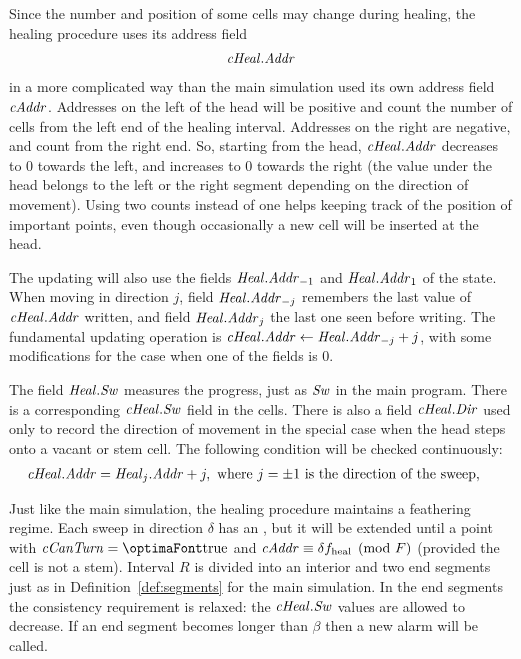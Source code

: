 \documentclass[12pt]{memoir}
\newcommand{\authnote}[3]
{\text{{ \textcolor{#3}{\( \langle\hspace{-0.2em}\langle \)\textsf{\footnotesize #1: #2}\( \rangle\hspace{-0.2em}\rangle \)}}}}
\newcommand{\authnote}[2]{}
\newcommand{\Pnote}[1]{{\authnote{P}{#1}{cyan}}}
\newcommand{\fld}[1]{\ensuremath{\textit{#1\/}}}
\newcommand{\tHeal}{f_{\mathrm{heal}}}
\newcommand{\R}{R}
\newcommand{\F}{F}
\newcommand{\Addr}{\fld{Addr}}
\newcommand{\cAddr}{\fld{cAddr}}
\newcommand{\cCanTurn}{\fld{cCanTurn}}
\newcommand{\Dir}{\fld{Dir}}
\newcommand{\Heal}{\fld{Heal}}
\newcommand{\cHeal}{\fld{cHeal}}
\newcommand{\Sweep}{\fld{Sw}}
\begin{document}
Since the number and position of some cells may change during healing, 
the healing procedure uses its address field
 \begin{align*}
 \cHeal.\Addr 
 \end{align*}
in a more complicated way than the main simulation used its own address field \( \cAddr \).
Addresses on the left of the head will be positive and count
the number of cells from the left end of the healing interval.
Addresses on the right are negative, and count from the right end.
So, starting from the head, \( \cHeal.\Addr \) decreases to 0 towards the left, 
and increases to 0 towards the right (the value under the head belongs to
the left or the right segment depending on the direction of movement).
Using two counts instead of one helps keeping track of the position of important points,
even though occasionally a new cell will be inserted at the head.

The updating will also use the fields
\( \Heal.\Addr_{-1} \) and \( \Heal.\Addr_{1} \) of the state.
When moving in direction \( j \), field \( \Heal.\Addr_{-j} \) remembers the last
value of \( \cHeal.\Addr \) written, and field \( \Heal.\Addr_{j} \) the last one seen 
before writing.
The fundamental updating operation is \( \cHeal.\Addr\gets\Heal.\Addr_{-j}+j \),
with some modifications for the case when one of the fields is 0. \Pnote{!}

The field \( \Heal.\Sweep \) 
measures the progress, just as \( \Sweep \) in the main program.
There is a corresponding \( \cHeal.\Sweep \) field in the cells.
There is also a field \( \cHeal.\Dir \) used only to record the direction
of movement in the special case when the head steps onto a vacant or stem cell.
The following condition will be checked continuously:
\begin{align*}
   \cHeal.\Addr   &= \Heal_{j}.\Addr + j, \text{ where } j = \pm 1  \text{ is the direction of the sweep},
 \end{align*}

Just like the main simulation, the healing procedure maintains a feathering regime.
Each sweep in direction \( \delta \) has an , but it
will be extended until a point with \( \cCanTurn=\true \) and 
\( \cAddr\equiv \delta\tHeal \pmod{\F}\) (provided the cell is not a stem).
Interval \( \R \) is divided into an interior and two end segments just as in
Definition~\ref{def:segments} for the main simulation.
In the end segments
the consistency requirement is relaxed: the \( \cHeal.\Sweep \) values are
allowed to decrease.
If an end segment becomes longer than \( \beta \) then a new alarm will be called.
\end{document}
